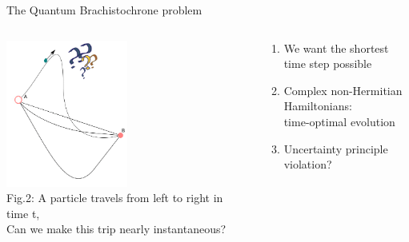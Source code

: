 \documentclass[10pt]{beamer}
\begin{document}
\begin{frame}{The Quantum Brachistochrone problem}
\vspace{0.5cm}
\begin{columns}
    \hspace{1.5em}
    \begin{column}{\textwidth}
    \includegraphics[width=0.5\textwidth]{optim-gif/optimisation-6}
    \\
    \hspace{1em}
    \tiny{Fig.2:
    A particle travels from left to right in time t,\\
    \hspace{2.4em}
    Can we make this trip nearly instantaneous?}
    \end{column}

    \hspace{-15em}
    \begin{column}{0.5\textwidth}
    \begin{enumerate}
        \item We want the shortest time step possible
        \pause
        \item \textcolor{myNewColorC}{Complex non-Hermitian Hamiltonians:\\ \quad time-optimal evolution}
        \pause
        \item \textcolor{myNewColorD}{Uncertainty principle violation?}
        \vspace{1cm}
    \end{enumerate}
    \end{column}
    \end{columns}
\end{frame}
\end{document}
